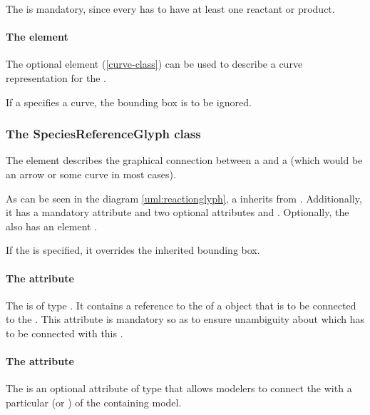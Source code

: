 The \ListOfSpeciesReferenceGlyphs is mandatory, since every \Reaction 
has to have at least one reactant or product. 


\paragraph {The  element}
The optional \Curve element (\ref{curve-class}) can be used to describe 
a curve representation for the \ReactionGlyph. 

If a \ReactionGlyph specifies a curve, the bounding box is to be 
ignored. 


\subsubsection{The SpeciesReferenceGlyph class}
\label{speciesreferenceglyph-class}
The  element describes the graphical 
connection between a \SpeciesGlyph and a \ReactionGlyph (which would be 
an arrow or some curve in most cases). 

As can be seen in the diagram \ref{uml:reactionglyph}, a 
\SpeciesReferenceGlyph inherits from \GraphicalObject. Additionally, it 
has a mandatory attribute  and two optional 
attributes  and . Optionally, the 
\SpeciesReferenceGlyph also has an element . 

If the  is specified, it overrides the inherited bounding box.


\paragraph{The  attribute}
The  is of type . It contains a 
reference to the  of a \SpeciesGlyph object that is to be 
connected to the \ReactionGlyph. 
This attribute is mandatory so as to ensure unambiguity about which 
\SpeciesGlyph has to be connected with this \ReactionGlyph. 

\paragraph{The  attribute}
The  is an optional attribute of type 
 that allows modelers to connect the \SpeciesReferenceGlyph with 
a particular \SpeciesReference (or \ModifierSpeciesReference) of the 
containing model. 


